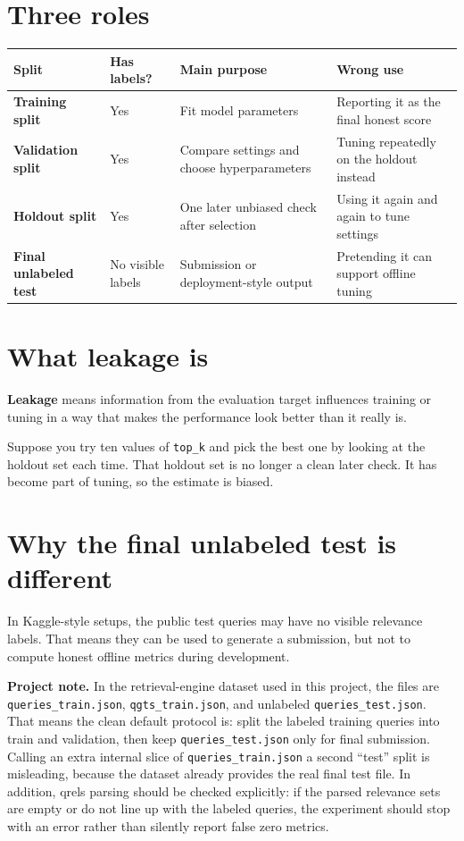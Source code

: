 \documentclass[11pt,oneside]{report}
\newcommand{\term}[1]{\textbf{#1}}
\newcommand{\code}[1]{\texttt{#1}}
\begin{document}
\section*{Three roles}
\begin{center}
\begin{tabularx}{\textwidth}{>{\bfseries}lYYY}
\toprule
Split & Has labels? & Main purpose & Wrong use \\
\midrule
Training split & Yes & Fit model parameters & Reporting it as the final honest score \\
Validation split & Yes & Compare settings and choose hyperparameters & Tuning repeatedly on the holdout instead \\
Holdout split & Yes & One later unbiased check after selection & Using it again and again to tune settings \\
Final unlabeled test & No visible labels & Submission or deployment-style output & Pretending it can support offline tuning \\
\bottomrule
\end{tabularx}
\end{center}

\section*{What leakage is}
\term{Leakage} means information from the evaluation target influences training or tuning in a way that makes the performance look better than it really is.

\begin{examplebox}
Suppose you try ten values of \code{top\_k} and pick the best one by looking at the holdout set each time. That holdout set is no longer a clean later check. It has become part of tuning, so the estimate is biased.
\end{examplebox}

\section*{Why the final unlabeled test is different}
In Kaggle-style setups, the public test queries may have no visible relevance labels. That means they can be used to generate a submission, but not to compute honest offline metrics during development.

\begin{examplebox}
\textbf{Project note.} In the retrieval-engine dataset used in this project, the files are \code{queries\_train.json}, \code{qgts\_train.json}, and unlabeled \code{queries\_test.json}. That means the clean default protocol is: split the labeled training queries into train and validation, then keep \code{queries\_test.json} only for final submission. Calling an extra internal slice of \code{queries\_train.json} a second ``test'' split is misleading, because the dataset already provides the real final test file. In addition, qrels parsing should be checked explicitly: if the parsed relevance sets are empty or do not line up with the labeled queries, the experiment should stop with an error rather than silently report false zero metrics.
\end{examplebox}
\end{document}
